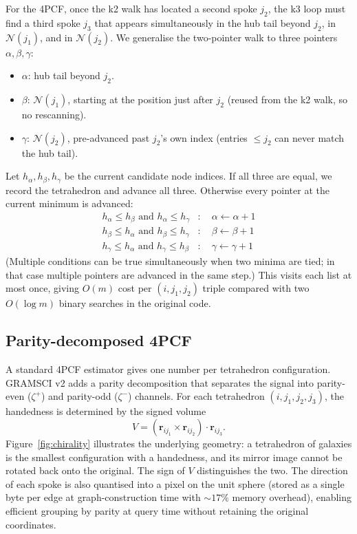 \documentclass[twocolumn]{aastex701}
\begin{document}
For the 4PCF, once the k2 walk has located a second spoke $j_2$, the k3
loop must find a third spoke $j_3$ that appears simultaneously in the hub
tail beyond $j_2$, in $\mathcal{N}(j_1)$, and in $\mathcal{N}(j_2)$.  We
generalise the two-pointer walk to three pointers $\alpha, \beta, \gamma$:
\begin{itemize}
\item $\alpha$: hub tail beyond $j_2$.
\item $\beta$: $\mathcal{N}(j_1)$, starting at the position just after
  $j_2$ (reused from the k2 walk, so no rescanning).
\item $\gamma$: $\mathcal{N}(j_2)$, pre-advanced past $j_2$'s own index
  (entries $\le j_2$ can never match the hub tail).
\end{itemize}
Let $h_\alpha, h_\beta, h_\gamma$ be the current candidate node indices.
If all three are equal, we record the tetrahedron and advance all three.
Otherwise every pointer at the current minimum is advanced:
\begin{equation}
\begin{aligned}
  h_\alpha \le h_\beta \text{ and } h_\alpha \le h_\gamma &: \quad
    \alpha \leftarrow \alpha + 1 \\
  h_\beta \le h_\alpha \text{ and } h_\beta \le h_\gamma &: \quad
    \beta \leftarrow \beta + 1 \\
  h_\gamma \le h_\alpha \text{ and } h_\gamma \le h_\beta &: \quad
    \gamma \leftarrow \gamma + 1
\end{aligned}
\label{eq:threeway}
\end{equation}
(Multiple conditions can be true simultaneously when two minima are tied;
in that case multiple pointers are advanced in the same step.)  This
visits each list at most once, giving $O(m)$ cost per $(i, j_1, j_2)$
triple compared with two $O(\log m)$ binary searches in the original code.

\subsection{Parity-decomposed 4PCF}
\label{sec:parity}

A standard 4PCF estimator gives one number per tetrahedron configuration.
GRAMSCI v2 adds a parity decomposition that separates the signal into
parity-even ($\zeta^{+}$) and parity-odd ($\zeta^{-}$) channels.  For each
tetrahedron $(i, j_1, j_2, j_3)$, the handedness is determined by the
signed volume
\begin{equation}
  V = (\mathbf{r}_{ij_1} \times \mathbf{r}_{ij_2}) \cdot \mathbf{r}_{ij_3}.
  \label{eq:volume}
\end{equation}
Figure~\ref{fig:chirality} illustrates the underlying geometry: a
tetrahedron of galaxies is the smallest configuration with a handedness,
and its mirror image cannot be rotated back onto the original.  The sign
of $V$ distinguishes the two.  The direction of each spoke is also
quantised into a pixel on the unit
sphere (stored as a single byte per edge at graph-construction time with
${\sim}17\%$ memory overhead), enabling efficient grouping by parity at
query time without retaining the original coordinates.
\end{document}
